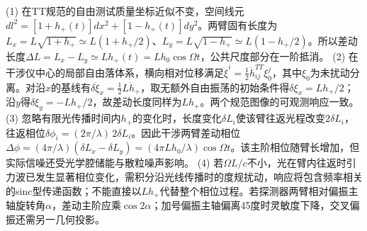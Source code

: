 (1) 在TT规范的自由测试质量坐标近似不变，空间线元\(dl^2=[1+h_+(t)]dx^2+[1-h_+(t)]dy^2\)。两臂固有长度为\(L_x=L\sqrt{1+h_+}\simeq L(1+h_+/2)\)、\(L_y=L\sqrt{1-h_+}\simeq L(1-h_+/2)\)。所以差动长度\(\Delta L=L_x-L_y\simeq Lh_+(t)=Lh_0\cos\Omega t\)，公共尺度部分在一阶抵消。
(2) 在干涉仪中心的局部自由落体系，横向相对位移满足\(\ddot\xi^i=\frac12\ddot h_{ij}^{TT}\xi_0^j\)，其中\(\xi_0\)为未扰动分离。对沿\(x\)的基线有\(\ddot{\delta\xi_x}=\frac12L\ddot h_+\)，取无额外自由振荡的初始条件得\(\delta\xi_x=Lh_+/2\)；沿\(y\)得\(\delta\xi_y=-Lh_+/2\)，故差动长度同样为\(Lh_+\)。两个规范图像的可观测响应一致。
(3) 忽略有限光传播时间内\(h_+\)的变化时，长度变化\(\delta L_i\)使该臂往返光程改变\(2\delta L_i\)，往返相位\(\delta\phi_i=(2\pi/\lambda)\,2\delta L_i\)。因此干涉两臂差动相位\(\Delta\phi=(4\pi/\lambda)(\delta L_x-\delta L_y)=(4\pi Lh_0/\lambda)\cos\Omega t\)。该主阶相位随臂长增加，但实际信噪还受光学腔储能与散粒噪声影响。
(4) 若\(\Omega L/c\)不小，光在臂内往返时引力波已发生显著相位变化，需积分沿光线传播时的度规扰动，响应将包含频率相关的sinc型传递函数；不能直接以\(Lh_+\)代替整个相位过程。若探测器两臂相对偏振主轴旋转角\(\alpha\)，差动主阶应乘\(\cos2\alpha\)；加号偏振主轴偏离45度时灵敏度下降，交叉偏振还需另一几何投影。
